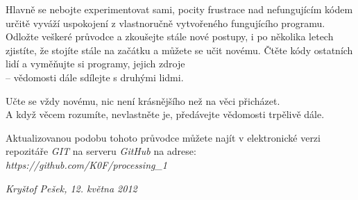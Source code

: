 \documentclass[10pt,twoside=true,open=right,cleardoublepage=empty,chapterprefix=true]{scrbook}
\begin{document}
Hlavně se nebojte experimentovat sami, pocity frustrace nad nefungujícím kódem určitě vyváží uspokojení z vlastnoručně vytvořeného fungujícího programu. Odložte veškeré průvodce a zkoušejte stále nové postupy, i po několika letech zjistíte, že stojíte stále na začátku a můžete se učit novému. Čtěte kódy ostatních lidí a vyměňujte si programy, jejich zdroje \\-- vědomosti dále sdílejte s druhými lidmi.

Učte se vždy novému, nic není krásnějšího než na věci přicházet. \\A když věcem rozumíte, nevlastněte je, předávejte vědomosti trpělivě dále.

\vfill

\pagestyle{empty}

Aktualizovanou podobu tohoto průvodce můžete najít v elektronické verzi repozitáře {\em GIT} na serveru {\em GitHub} na adrese:\\
{\em https://github.com/K0F/processing\_1}

\begin{flushright}
{\em Kryštof Pešek, 12. května 2012}
\end{flushright}

\printglossaries

\printindex


%
%
%
\end{document}

